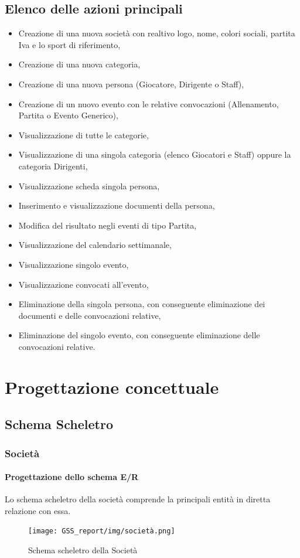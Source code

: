 \documentclass[a4paper,12pt]{report}
\begin{document}
\section{Elenco delle azioni principali}
\begin{itemize}
    \item Creazione di una nuova società con realtivo logo, nome, colori sociali, partita Iva e lo sport di riferimento,
    \item Creazione di una nuova categoria,
    \item Creazione di una nuova persona (Giocatore, Dirigente o Staff),
    \item Creazione di un nuovo evento con le relative convocazioni (Allenamento, Partita o Evento Generico),
    \item Visualizzazione di tutte le categorie,
    \item Visualizzazione di una singola categoria (elenco Giocatori e Staff) oppure la categoria Dirigenti,
    \item Visualizzazione scheda singola persona,
    \item Inserimento e visualizzazione documenti della persona,
    \item Modifica del risultato negli eventi di tipo Partita,
    \item Visualizzazione del calendario settimanale,
    \item Visualizzazione singolo evento,
    \item Visualizzazione convocati all'evento,
    \item Eliminazione della singola persona, con conseguente eliminazione dei documenti e delle convocazioni relative,
    \item Eliminazione del singolo evento, con conseguente eliminazione delle convocazioni relative.
\end{itemize}


\chapter{Progettazione concettuale}
\section{Schema Scheletro}
\subsection{Società}
\subsubsection{Progettazione dello schema E/R}
Lo schema scheletro della società comprende la principali entità in diretta relazione con essa.
\newline
\begin{figure}[htp]
    \centering
    \texttt{[image: GSS\_report/img/società.png]}
    \caption{Schema scheletro della Società}
    \label{fig:umlAnalisys}
\end{figure}
\end{document}
